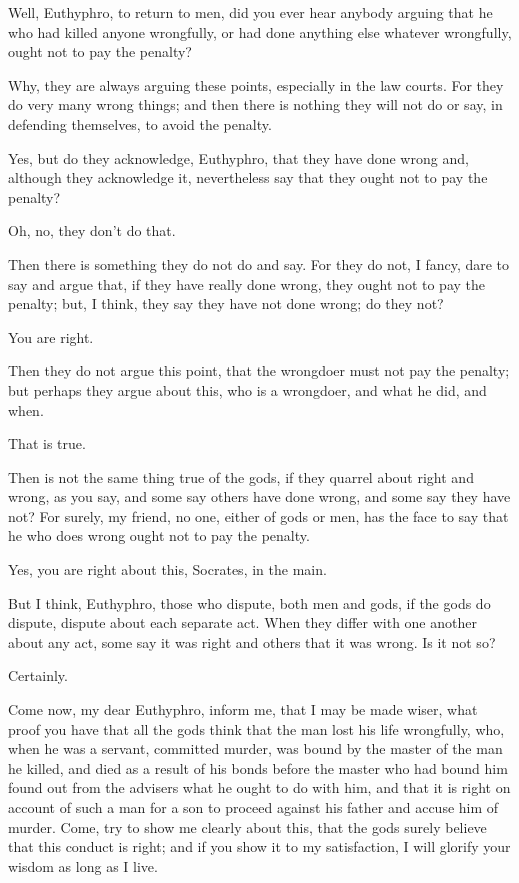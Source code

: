 \documentclass[letterpaper,12pt]{article}
\newcommand{\stephpag}[1]{\marginnote{\small\itshape\fontfamily{ppl}\selectfont #1}}
\begin{document}
\begin{drama}
\socratesspeaks
Well, Euthyphro, to return to men, did you ever hear anybody arguing that he who had killed anyone wrongfully, \stephpag{c} or had done anything else whatever wrongfully, ought not to pay the penalty?

\euthyphrospeaks
Why, they are always arguing these points, especially in the law courts. For they do very many wrong things; and then there is nothing they will not do or say, in defending themselves, to avoid the penalty.

\socratesspeaks
Yes, but do they acknowledge, Euthyphro, that they have done wrong and, although they acknowledge it, nevertheless say that they ought not to pay the penalty?

\euthyphrospeaks
Oh, no, they don't do that.

\socratesspeaks
Then there is something they do not do and say. For they do not, I fancy, dare to say and argue that, \stephpag{d} if they have really done wrong, they ought not to pay the penalty; but, I think, they say they have not done wrong; do they not?

\euthyphrospeaks
You are right.

\socratesspeaks
Then they do not argue this point, that the wrongdoer must not pay the penalty; but perhaps they argue about this, who is a wrongdoer, and what he did, and when.

\euthyphrospeaks
That is true.

\socratesspeaks
Then is not the same thing true of the gods, if they quarrel about right and wrong, as you say, and some say others have done wrong, and some say they have not? For surely, my friend, no one, either of gods or men, \stephpag{e} has the face to say that he who does wrong ought not to pay the penalty.

\euthyphrospeaks
Yes, you are right about this, Socrates, in the main.

\socratesspeaks
But I think, Euthyphro, those who dispute, both men and gods, if the gods do dispute, dispute about each separate act. When they differ with one another about any act, some say it was right and others that it was wrong. Is it not so?

\euthyphrospeaks
Certainly.

\socratesspeaks
Come now, my dear Euthyphro, \stephpag{9a} inform me, that I may be made wiser, what proof you have that all the gods think that the man lost his life wrongfully, who, when he was a servant, committed murder, was bound by the master of the man he killed, and died as a result of his bonds before the master who had bound him found out from the advisers what he ought to do with him, and that it is right on account of such a man for a son to proceed against his father and accuse him of murder. Come, try to show me clearly about this, that \stephpag{b} the gods surely believe that this conduct is right; and if you show it to my satisfaction, I will glorify your wisdom as long as I live.


\end{drama}
\end{document}
